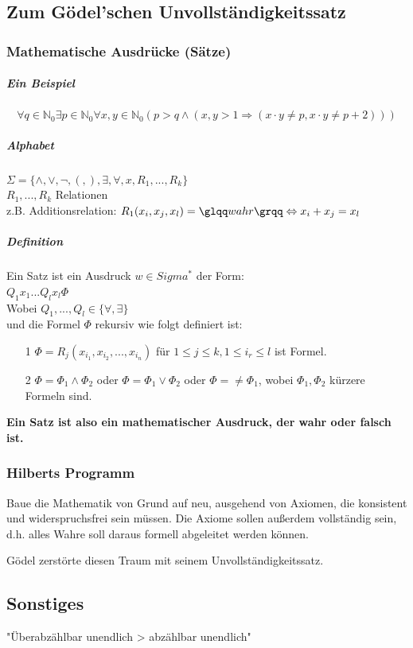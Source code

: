 \documentclass[fleqn]{scrartcl}
\begin{document}
\subsection{Zum Gödel'schen Unvollständigkeitssatz}
\subsubsection{Mathematische Ausdrücke (Sätze)}
\subparagraph{Ein Beispiel}
\[\forall q \in \mathbb{N}_0 \exists p \in \mathbb{N}_0 \forall x, y \in \mathbb{N}_0 (p > q \land (x, y > 1 \Rightarrow (x \cdot y \neq p, x \cdot y \neq p + 2)))\]
\subparagraph{Alphabet} $\Sigma = \{\land, \lor, \neg, (, ), \exists, \forall, x, R_1, ..., R_k \}$\\
$R_1, ..., R_k$ Relationen\\
z.B. Additionsrelation: $R_1(x_i, x_j, x_l) = \glqq wahr\grqq \Leftrightarrow x_i + x_j = x_l$
\subparagraph{Definition} 
Ein Satz ist ein Ausdruck $w \in Sigma^*$ der Form:\\
$Q_1x_1 ... Q_lx_l \Phi$\\
Wobei $Q_1, ..., Q_l \in \{\forall, \exists\}$\\
und die Formel $\Phi$ rekursiv wie folgt definiert ist:
\begin{itemize}
\item[1] $\Phi = R_j(x_{i_1}, x_{i_2},..., x_{i_n})$ für $1 \leq j \leq k, 1 \leq i_r \leq l$ ist Formel.
\item[2] $\Phi = \Phi_1 \land \Phi_2$ oder $\Phi = \Phi_1 \lor \Phi_2$ oder $\Phi = \neq \Phi_1$, wobei $\Phi_1, \Phi_2$ kürzere Formeln sind.
\end{itemize}
\textbf{Ein Satz ist also ein mathematischer Ausdruck, der wahr oder falsch ist.}

\subsubsection{Hilberts Programm}
Baue die Mathematik von Grund auf neu, ausgehend von Axiomen, die konsistent und widerspruchsfrei sein müssen. Die Axiome sollen außerdem vollständig sein, d.h. alles Wahre soll daraus formell abgeleitet werden können.

Gödel zerstörte diesen Traum mit seinem Unvollständigkeitssatz.






\subsection{Sonstiges}
"Überabzählbar unendlich > abzählbar unendlich"


\end{document}
